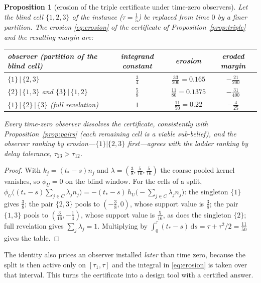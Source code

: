 \documentclass[11pt,a4paper]{article}
\theoremstyle{plain}
\newtheorem{proposition}[theorem]{Proposition}
\theoremstyle{definition}
\theoremstyle{remark}
\newcommand{\tfr}[2]{\tfrac{#1}{#2}}
\newcommand{\dd}{\,\mathrm{d}}
\begin{document}
\begin{proposition}[erosion of the triple certificate under time-zero observers]\label{prop:erosionrows}
Let the blind cell $\{1,2,3\}$ of the instance ($\tau=\tfr15$) be replaced from time $0$ by a finer partition. The erosion \eqref{eq:erosion} of the certificate of Proposition~\ref{prop:triple} and the resulting margin are:
\begin{center}\small
\begin{tabular}{@{}lccc@{}}
\toprule
observer (partition of the blind cell) & integrand constant & erosion & eroded margin\\
\midrule
$\{1\}\,|\,\{2,3\}$ & $\tfr34$ & $\tfr{33}{200}=0.165$ & $-\tfr{21}{200}$\\
$\{2\}\,|\,\{1,3\}$ and $\{3\}\,|\,\{1,2\}$ & $\tfr58$ & $\tfr{11}{80}=0.1375$ & $-\tfr{31}{400}$\\
$\{1\}\,|\,\{2\}\,|\,\{3\}$ (full revelation) & $1$ & $\tfr{11}{50}=0.22$ & $-\tfr4{25}$\\
\bottomrule
\end{tabular}
\end{center}
Every time-zero observer dissolves the certificate, consistently with Proposition~\ref{prop:pairs} (each remaining cell is a viable sub-belief), and the observer ranking by erosion---$\{1\}|\{2,3\}$ first---agrees with the ladder ranking by delay tolerance, $\tau_{23}>\tau_{12}$.
\end{proposition}

\begin{proof}
With $k_j=(t_\ast-s)n_j$ and $\lambda=(\tfr38,\tfr5{16},\tfr5{16})$ the coarse pooled kernel vanishes, so $\phi_U=0$ on the blind window. For the cells of a split, $\phi_U\bigl((t_\ast-s)\sum_{j\in C}\lambda_jn_j\bigr)=-(t_\ast-s)\,h_U\bigl(-\sum_{j\in C}\lambda_jn_j\bigr)$: the singleton $\{1\}$ gives $\tfr38$; the pair $\{2,3\}$ pools to $(-\tfr38,0)$, whose support value is $\tfr38$; the pair $\{1,3\}$ pools to $(\tfr3{16},-\tfr14)$, whose support value is $\tfr5{16}$, as does the singleton $\{2\}$; full revelation gives $\sum_j\lambda_j=1$. Multiplying by $\int_0^\tau(t_\ast-s)\dd s=\tau+\tau^2/2=\tfr{11}{50}$ gives the table.
\end{proof}

The identity also prices an observer installed \emph{later} than time zero, because the split is then active only on $[\tau_1,\tau]$ and the integral in \eqref{eq:erosion} is taken over that interval. This turns the certificate into a design tool with a certified answer.
\end{document}
